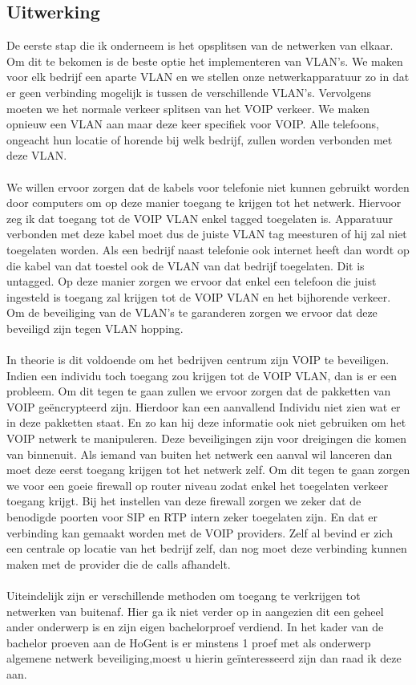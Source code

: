 \documentclass[pdftex,a4paper,12pt,twoside]{report}
\begin{document}
\subsection{Uitwerking}
De eerste stap die ik onderneem is het opsplitsen van de netwerken van elkaar. Om dit te bekomen is de beste optie het implementeren van VLAN's. We maken voor elk bedrijf een aparte VLAN en we stellen onze netwerkapparatuur zo in dat er geen verbinding mogelijk is tussen de verschillende VLAN's. Vervolgens moeten we het normale verkeer splitsen van het VOIP verkeer.
We maken opnieuw een VLAN aan maar deze keer specifiek voor VOIP. Alle telefoons, ongeacht hun locatie of horende bij welk bedrijf, zullen worden verbonden met deze VLAN.
\\ \\
We willen ervoor zorgen dat de kabels voor telefonie niet kunnen gebruikt worden door computers om op deze manier toegang te krijgen tot het netwerk. Hiervoor zeg ik dat toegang tot de VOIP VLAN enkel tagged toegelaten is. Apparatuur verbonden met deze kabel moet dus de juiste VLAN tag meesturen of hij zal niet toegelaten worden. Als een bedrijf naast telefonie ook internet heeft dan wordt op die kabel van dat toestel ook de VLAN van dat bedrijf toegelaten. Dit is untagged. Op deze manier zorgen we ervoor dat enkel een telefoon die juist ingesteld is toegang zal krijgen tot de VOIP VLAN en het bijhorende verkeer.  Om de beveiliging van de VLAN's te garanderen zorgen we ervoor dat deze beveiligd zijn tegen VLAN hopping. 
\\ \\
In theorie is dit voldoende om het bedrijven centrum zijn VOIP te beveiligen. Indien een individu toch toegang zou krijgen tot de VOIP VLAN, dan is er een probleem. Om dit tegen te gaan zullen we ervoor zorgen dat de pakketten van VOIP geëncrypteerd zijn. Hierdoor kan een aanvallend Individu niet zien wat er in deze pakketten staat. En zo kan hij deze informatie ook niet gebruiken om het VOIP netwerk te manipuleren.
\newpage
Deze beveiligingen zijn voor dreigingen die komen van binnenuit. Als iemand van buiten het netwerk een aanval wil lanceren dan moet deze eerst toegang krijgen tot het netwerk zelf. Om dit tegen te gaan zorgen we voor een goeie firewall op router niveau zodat enkel het toegelaten verkeer toegang krijgt. Bij het instellen van deze firewall zorgen we zeker dat de benodigde poorten voor SIP en RTP intern zeker toegelaten zijn. En dat er verbinding kan gemaakt worden met de VOIP providers. Zelf al bevind er zich een centrale op locatie van het bedrijf zelf, dan nog moet deze verbinding kunnen maken met de provider die de calls afhandelt.
 \\ \\
Uiteindelijk zijn er verschillende methoden om toegang te verkrijgen tot netwerken van buitenaf. Hier ga ik niet verder op in aangezien dit een geheel ander onderwerp is en zijn eigen bachelorproef verdiend. In het kader van de bachelor proeven aan de HoGent is er minstens 1 proef met als onderwerp algemene netwerk beveiliging,moest u hierin geïnteresseerd zijn dan raad ik deze aan.
\end{document}
